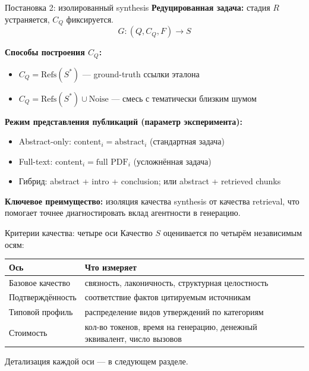 \documentclass[10pt,aspectratio=169]{beamer}
\begin{document}
\begin{frame}{Постановка 2: изолированный synthesis}
  \textbf{Редуцированная задача:} стадия $R$ устраняется, $C_Q$ фиксируется.
  \[
    G: (Q, C_Q, F) \to S
  \]

  \textbf{Способы построения $C_Q$:}
  \begin{itemize}
    \item $C_Q = \text{Refs}(S^*)$ --- ground-truth ссылки эталона
    \item $C_Q = \text{Refs}(S^*) \cup \text{Noise}$ --- смесь с тематически близким шумом
  \end{itemize}

  \textbf{Режим представления публикаций (параметр эксперимента):}
  \begin{itemize}
    \item Abstract-only: $\text{content}_i = \text{abstract}_i$ (стандартная задача)
    \item Full-text: $\text{content}_i = \text{full PDF}_i$ (усложнённая задача)
    \item Гибрид: abstract + intro + conclusion; или abstract + retrieved chunks
  \end{itemize}

  \textbf{Ключевое преимущество:} изоляция качества synthesis от качества retrieval, что помогает точнее диагностировать вклад агентности в генерацию.
\end{frame}

\begin{frame}{Критерии качества: четыре оси}
  Качество $S$ оценивается по четырём независимым осям:

  \vspace{0.4cm}
  \begin{tabular}{ll}
    \toprule
    \textbf{Ось} & \textbf{Что измеряет} \\
    \midrule
    Базовое качество & связность, лаконичность, структурная целостность \\
    Подтверждённость & соответствие фактов цитируемым источникам \\
    Типовой профиль & распределение видов утверждений по категориям \\
    Стоимость & кол-во токенов, время на генерацию, денежный эквивалент, число вызовов \\
    \bottomrule
  \end{tabular}

  \vspace{0.4cm}
  Детализация каждой оси --- в следующем разделе.
\end{frame}
\end{document}
